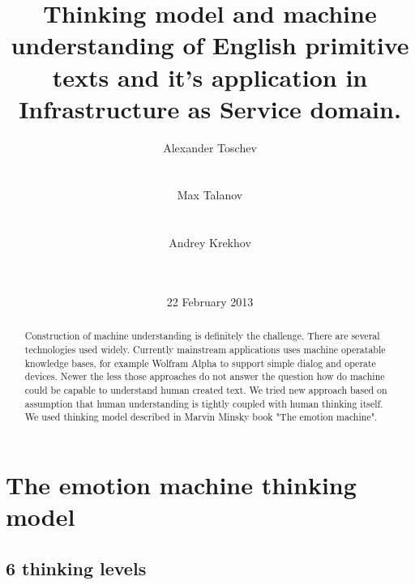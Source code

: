 \documentclass{acm_proc_article-sp}
\begin{document}
\title{Thinking model and machine understanding of English primitive texts and it's application in Infrastructure as Service domain.}

\author{
\alignauthor Alexander Toschev\\
       \\
       \\
\alignauthor Max Talanov\\
       \\
       \\
\alignauthor Andrey Krekhov\\
       \\
       \\
}

\date{22 February 2013}

\maketitle

\begin{abstract}

Construction of machine understanding is definitely the challenge. There are several technologies used widely.
Currently mainstream applications uses machine operatable knowledge bases, for example Wolfram Alpha to support simple dialog and operate devices.
Newer the less those approaches do not answer the question how do machine could be capable to understand human created text.
We tried new approach based on assumption that human understanding is tightly coupled with human thinking itself.
We used thinking model described in Marvin Minsky book "The emotion machine".

\end{abstract}

\section{The emotion machine thinking model}
\subsection{6 thinking levels}
\end{document}
